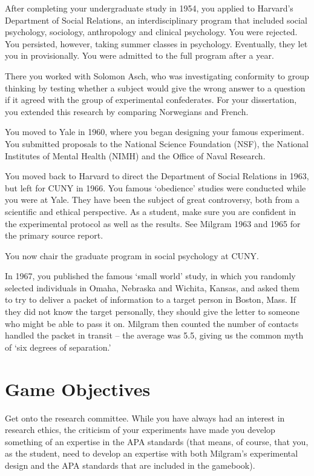 \begin{refsection}
After completing your undergraduate study in 1954, you applied to Harvard's Department of Social Relations, an interdisciplinary program that included social psychology, sociology, anthropology and clinical psychology. You were rejected. You persisted, however, taking summer classes in psychology. Eventually, they let you in provisionally. You were admitted to the full program after a year.

There you worked with Solomon Asch, who was investigating conformity to group thinking by testing whether a subject would give the wrong answer to a question if it agreed with the group of experimental confederates. For your dissertation, you extended this research by comparing Norwegians and French.

You moved to Yale in 1960, where you began designing your famous experiment. You submitted proposals to the National Science Foundation (NSF), the National Institutes of Mental Health (NIMH) and the Office of Naval Research.

You moved back to Harvard to direct the Department of Social Relations in 1963, but left for CUNY in 1966. You famous `obedience' studies were conducted while you were at Yale. They have been the subject of great controversy, both from a scientific and ethical perspective. As a student, make sure you are confident in the experimental protocol as well as the results. See Milgram 1963 and 1965 for the primary source report.

You now chair the graduate program in social psychology at CUNY.

In 1967, you published the famous `small world' study, in which you randomly selected individuals in Omaha, Nebraska and Wichita, Kansas, and asked them to try to deliver a packet of information to a target person in Boston, Mass. If they did not know the target personally, they should give the letter to someone who might be able to pass it on. Milgram then counted the number of contacts handled the packet in transit – the average was 5.5, giving us the common myth of `six degrees of separation.' 

\section{Game Objectives}
\label{gameobjectives}

Get onto the research committee. While you have always had an interest in research ethics, the criticism of your experiments have made you develop something of an expertise in the APA standards (that means, of course, that you, as the student, need to develop an expertise with both Milgram's experimental design and the APA standards that are included in the gamebook).


\end{refsection}
